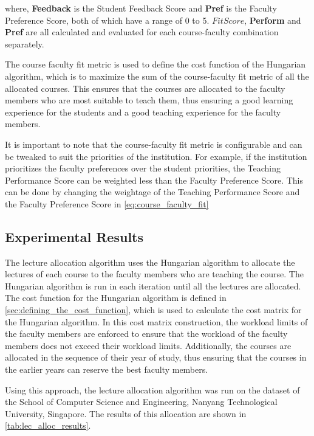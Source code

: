 where, \textbf{Feedback} is the Student Feedback Score and \textbf{Pref} is the Faculty Preference Score, both of which have a range of 0 to 5. \(FitScore\), \textbf{Perform} and \textbf{Pref} are all calculated and evaluated for each course-faculty combination separately.

The course faculty fit metric is used to define the cost function of the Hungarian algorithm, which is to maximize the sum of the course-faculty fit metric of all the allocated courses. This ensures that the courses are allocated to the faculty members who are most suitable to teach them, thus ensuring a good learning experience for the students and a good teaching experience for the faculty members.

It is important to note that the course-faculty fit metric is configurable and can be tweaked to suit the priorities of the institution. For example, if the institution prioritizes the faculty preferences over the student priorities, the Teaching Performance Score can be weighted less than the Faculty Preference Score. This can be done by changing the weightage of the Teaching Performance Score and the Faculty Preference Score in \autoref{eq:course_faculty_fit}

\subsection{Experimental Results}

The lecture allocation algorithm uses the Hungarian algorithm to allocate the lectures of each course to the faculty members who are teaching the course. The Hungarian algorithm is run in each iteration until all the lectures are allocated. The cost function for the Hungarian algorithm is defined in \autoref{sec:defining_the_cost_function}, which is used to calculate the cost matrix for the Hungarian algorithm. In this cost matrix construction, the workload limits of the faculty members are enforced to ensure that the workload of the faculty members does not exceed their workload limits. Additionally, the courses are allocated in the sequence of their year of study, thus ensuring that the courses in the earlier years can reserve the best faculty members.

Using this approach, the lecture allocation algorithm was run on the dataset of the School of Computer Science and Engineering, Nanyang Technological University, Singapore. The results of this allocation are shown in \autoref{tab:lec_alloc_results}.


